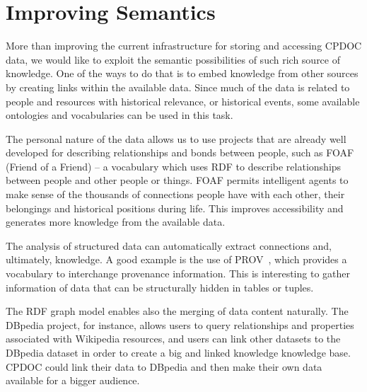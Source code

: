 
\section{Improving Semantics}\label{sec:mapping}

More than improving the current infrastructure for storing and
accessing CPDOC data, we would like to exploit the semantic
possibilities of such rich source of knowledge. One of the ways to do
that is to embed knowledge from other sources by creating links within
the available data. Since much of the data is related to people and
resources with historical relevance, or historical events, some
available ontologies and vocabularies can be used in this task.

The personal nature of the data allows us to use projects that are
already well developed for describing relationships and bonds between
people, such as FOAF~\cite{foaf} (Friend of a Friend) -- a vocabulary
which uses RDF to describe relationships between people and other
people or things. FOAF permits intelligent agents to make sense of the
thousands of connections people have with each other, their belongings
and historical positions during life. This improves accessibility and
generates more knowledge from the available data.

The analysis of structured data can automatically extract connections
and, ultimately, knowledge. A good example is the use of
PROV~\cite{prov}, which provides a vocabulary to interchange
provenance information. This is interesting to gather information of
data that can be structurally hidden in tables or tuples.

The RDF graph model enables also the merging of data content
naturally. The DBpedia project, for instance, allows users to query
relationships and properties associated with Wikipedia resources, and
users can link other datasets to the DBpedia dataset in order to
create a big and linked knowledge knowledge base. CPDOC could link
their data to DBpedia and then make their own data available for a
bigger audience.

